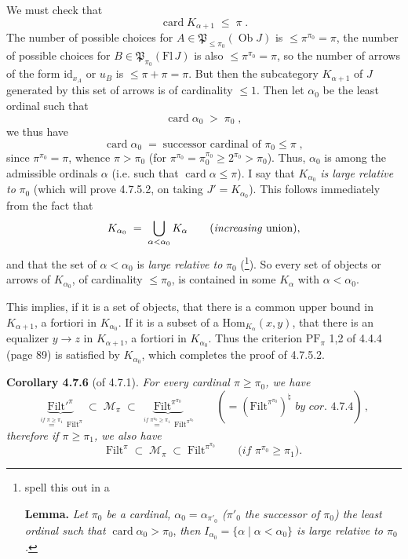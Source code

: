 \documentclass[11pt]{article}
\newcommand{\printedpage}[1]{\marginpar{\footnotesize p.~#1}}
\newcommand{\msp}[1]{\marginpar{\footnotesize [#1]}}
\newcommand{\Filt}{\mathrm{Filt}}
\newcommand{\card}{\operatorname{card}}
\newcommand{\Ob}{\operatorname{Ob}}
\begin{document}
We must check that
\[
\card K_{\alpha+1} \;\leqslant\; \pi \;.
\]
The number of possible choices for $A \in \mathfrak{P}_{\leqslant \pi_0}(\Ob J)$ \msp{page 170} is $\leqslant \pi^{\pi_0} = \pi$, the number of possible choices for $B \in \mathfrak{P}_{\pi_0}(\mathrm{Fl}\, J)$ is also $\leqslant \pi^{\pi_0} = \pi$, so the number of arrows of the form $\mathrm{id}_{x_A}$ or $u_B$ is $\leqslant \pi + \pi = \pi$. But then the subcategory $K_{\alpha+1}$ of $J$ generated by this set of arrows is of cardinality $\leqslant 1$. Then let %
\printedpage{57}
$\alpha_0$ be the least ordinal such that
\[
\card \alpha_0 \;>\; \pi_0 \;,
\]
we thus have
\[
\card \alpha_0 \;=\; \text{successor cardinal of } \pi_0 \leqslant \pi \;,
\]
since $\pi^{\pi_0} = \pi$, whence $\pi > \pi_0$ (for $\pi^{\pi_0} = \pi_0^{\pi_0} \geqslant 2^{\pi_0} > \pi_0$). Thus, $\alpha_0$ is among the admissible ordinals $\alpha$ (i.e. such that $\card \alpha \leqslant \pi$). I say that $K_{\alpha_0}$ \textit{is large relative to} $\pi_0$ (which will prove 4.7.5.2, on taking $J' = K_{\alpha_0}$). This follows immediately from the fact that
\[
K_{\alpha_0} \;=\; \bigcup_{\alpha < \alpha_0} K_{\alpha} \qquad (\text{\textit{increasing} union}),
\]
and that the set of $\alpha < \alpha_0$ is \textit{large relative to} $\pi_0$ (\footnote[71]{spell this out in a

\textbf{Lemma.} \textit{Let $\pi_0$ be a cardinal, $\alpha_0 = \alpha_{\pi'_0}$ ($\pi'_0$ the successor of $\pi_0$) the least ordinal such that} $\card \alpha_0 > \pi_0$, \textit{then $I_{\alpha_0} = \{\alpha \mid \alpha < \alpha_0\}$ is large relative to $\pi_0$.}}). So every set of objects or arrows of $K_{\alpha_0}$, of cardinality $\leqslant \pi_0$, is contained in some $K_{\alpha}$ with $\alpha < \alpha_0$.

\msp{page 171}
This implies, if it is a set of objects, that there is a common upper bound in $K_{\alpha+1}$, a fortiori in $K_{\alpha_0}$. If it is a subset of a $\mathrm{Hom}_{K_{\alpha}}(x,y)$, that there is an equalizer $y \longrightarrow z$ in $K_{\alpha+1}$, a fortiori in $K_{\alpha_0}$. Thus the criterion $\mathrm{PF}_{\pi}$ 1,2 of 4.4.4 (page 89) is satisfied by $K_{\alpha_0}$, which completes the proof of 4.7.5.2.

\textbf{Corollary 4.7.6} (of 4.7.1). \textit{For every cardinal $\pi \geqslant \pi_0$, we have}
\[
\underbrace{\Filt'^{\pi}}_{\overset{\textit{if } \pi \geqslant \pi_1}{=}\ \Filt^{\pi}} \;\subset\; \mathcal{M}_{\pi} \;\subset\; \underbrace{\Filt^{\pi^{\pi_0}}}_{\overset{\textit{if } \pi^{\pi_0} \geqslant \pi_1}{=}\ \Filt^{\pi^{\pi_0}}} \qquad (= (\Filt^{\pi^{\pi_0}})^{\natural} \textit{ by cor. 4.7.4})\,, \tag*{(4.7.6.1)} %
\]
\textit{therefore if $\pi \geqslant \pi_1$, we also have}
\[
\Filt^{\pi} \;\subset\; \mathcal{M}_{\pi} \;\subset\; \Filt^{\pi^{\pi_0}} \qquad \textit{(if $\pi^{\pi_0} \geqslant \pi_1$).} \tag*{(4.7.6.2)}
\]
\end{document}

